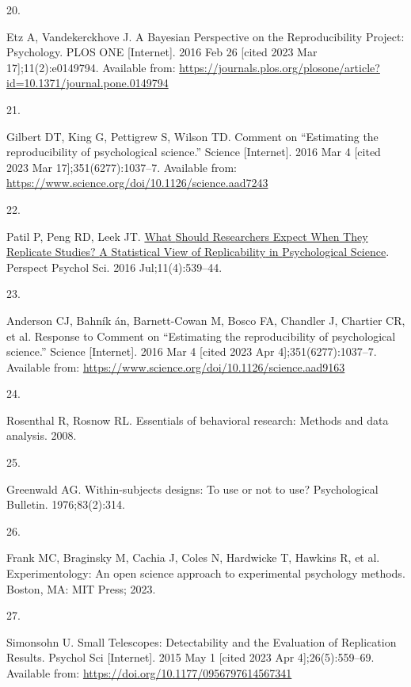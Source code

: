 \documentclass[
  english,
  a4paper,
]{article}
\newlength{\cslhangindent}
\newlength{\csllabelwidth}
\newlength{\cslentryspacingunit} %
\newenvironment{CSLReferences}[2] %
 {%
  \setlength{\parindent}{0pt}
  \ifodd #1
  \let\oldpar\par
  \def\par{\hangindent=\cslhangindent\oldpar}
  \fi
  \setlength{\parskip}{#2\cslentryspacingunit}
 }%
 {}
\newcommand{\CSLLeftMargin}[1]{\parbox[t]{\csllabelwidth}{#1}}
\newcommand{\CSLRightInline}[1]{\parbox[t]{\linewidth - \csllabelwidth}{#1}\break}
\begin{document}
\begin{CSLReferences}{0}{0}
\leavevmode{}%
\CSLLeftMargin{20. }%
\CSLRightInline{Etz A, Vandekerckhove J. A {Bayesian Perspective} on the {Reproducibility Project}: {Psychology}. PLOS ONE {[}Internet{]}. 2016 Feb 26 {[}cited 2023 Mar 17{]};11(2):e0149794. Available from: \url{https://journals.plos.org/plosone/article?id=10.1371/journal.pone.0149794}}

\leavevmode{}%
\CSLLeftMargin{21. }%
\CSLRightInline{Gilbert DT, King G, Pettigrew S, Wilson TD. Comment on {``{Estimating} the reproducibility of psychological science.''} Science {[}Internet{]}. 2016 Mar 4 {[}cited 2023 Mar 17{]};351(6277):1037--7. Available from: \url{https://www.science.org/doi/10.1126/science.aad7243}}

\leavevmode{}%
\CSLLeftMargin{22. }%
\CSLRightInline{Patil P, Peng RD, Leek JT. \href{https://doi.org/10.1177/1745691616646366}{What {Should Researchers Expect When They Replicate Studies}? {A Statistical View} of {Replicability} in {Psychological Science}}. Perspect Psychol Sci. 2016 Jul;11(4):539--44. }

\leavevmode{}%
\CSLLeftMargin{23. }%
\CSLRightInline{Anderson CJ, Bahník án, Barnett-Cowan M, Bosco FA, Chandler J, Chartier CR, et al. Response to {Comment} on {``{Estimating} the reproducibility of psychological science.''} Science {[}Internet{]}. 2016 Mar 4 {[}cited 2023 Apr 4{]};351(6277):1037--7. Available from: \url{https://www.science.org/doi/10.1126/science.aad9163}}

\leavevmode{}%
\CSLLeftMargin{24. }%
\CSLRightInline{Rosenthal R, Rosnow RL. Essentials of behavioral research: Methods and data analysis. 2008. }

\leavevmode{}%
\CSLLeftMargin{25. }%
\CSLRightInline{Greenwald AG. Within-subjects designs: To use or not to use? Psychological Bulletin. 1976;83(2):314. }

\leavevmode{}%
\CSLLeftMargin{26. }%
\CSLRightInline{Frank MC, Braginsky M, Cachia J, Coles N, Hardwicke T, Hawkins R, et al. Experimentology: An open science approach to experimental psychology methods. Boston, MA: MIT Press; 2023. }

\leavevmode{}%
\CSLLeftMargin{27. }%
\CSLRightInline{Simonsohn U. Small {Telescopes}: {Detectability} and the {Evaluation} of {Replication Results}. Psychol Sci {[}Internet{]}. 2015 May 1 {[}cited 2023 Apr 4{]};26(5):559--69. Available from: \url{https://doi.org/10.1177/0956797614567341}}


\end{CSLReferences}
\end{document}
